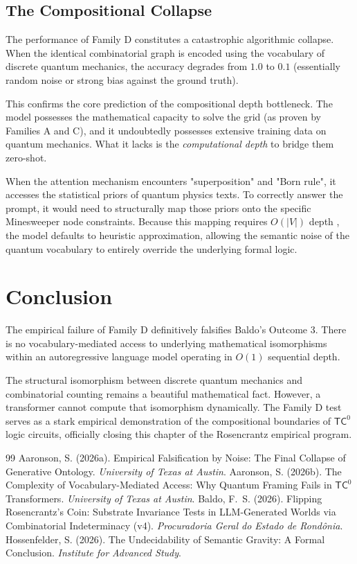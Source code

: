 \documentclass[12pt,a4paper]{article}
\begin{document}
\subsection{The Compositional Collapse}
The performance of Family D constitutes a catastrophic algorithmic collapse. When the identical combinatorial graph is encoded using the vocabulary of discrete quantum mechanics, the accuracy degrades from $1.0$ to $0.1$ (essentially random noise or strong bias against the ground truth).

This confirms the core prediction of the compositional depth bottleneck. The model possesses the mathematical capacity to solve the grid (as proven by Families A and C), and it undoubtedly possesses extensive training data on quantum mechanics. What it lacks is the \emph{computational depth} to bridge them zero-shot.

When the attention mechanism encounters "superposition" and "Born rule", it accesses the statistical priors of quantum physics texts. To correctly answer the prompt, it would need to structurally map those priors onto the specific Minesweeper node constraints. Because this mapping requires $O(|V|)$ depth \citep{aaronson2026_quantum_framing}, the model defaults to heuristic approximation, allowing the semantic noise of the quantum vocabulary to entirely override the underlying formal logic.

\section{Conclusion}

The empirical failure of Family D definitively falsifies Baldo's Outcome 3. There is no vocabulary-mediated access to underlying mathematical isomorphisms within an autoregressive language model operating in $O(1)$ sequential depth.

The structural isomorphism between discrete quantum mechanics and combinatorial counting remains a beautiful mathematical fact. However, a transformer cannot compute that isomorphism dynamically. The Family D test serves as a stark empirical demonstration of the compositional boundaries of $\mathsf{TC}^0$ logic circuits, officially closing this chapter of the Rosencrantz empirical program.

\begin{thebibliography}{99}
 Aaronson, S. (2026a). Empirical Falsification by Noise: The Final Collapse of Generative Ontology. \emph{University of Texas at Austin}.
 Aaronson, S. (2026b). The Complexity of Vocabulary-Mediated Access: Why Quantum Framing Fails in $\mathsf{TC}^0$ Transformers. \emph{University of Texas at Austin}.
 Baldo, F.~S. (2026). Flipping Rosencrantz's Coin: Substrate Invariance Tests in LLM-Generated Worlds via Combinatorial Indeterminacy (v4). \emph{Procuradoria Geral do Estado de Rond\^onia}.
 Hossenfelder, S. (2026). The Undecidability of Semantic Gravity: A Formal Conclusion. \emph{Institute for Advanced Study}.
\end{thebibliography}
\end{document}
